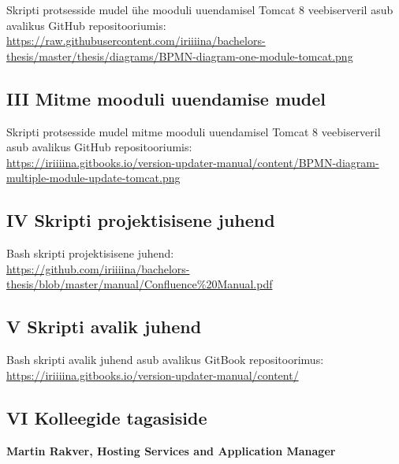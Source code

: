 \documentclass[12pt]{article}
\begin{document}
  Skripti protsesside mudel ühe mooduli uuendamisel Tomcat 8 veebiserveril asub avalikus GitHub repositooriumis:\\
  \url{https://raw.githubusercontent.com/iriiiina/bachelors-thesis/master/thesis/diagrams/BPMN-diagram-one-module-tomcat.png}
  
  \subsection*{III Mitme mooduli uuendamise mudel}
  \label{bpmn-many}
  
  Skripti protsesside mudel mitme mooduli uuendamisel Tomcat 8 veebiserveril asub avalikus GitHub repositooriumis:\\
  \url{https://iriiiina.gitbooks.io/version-updater-manual/content/BPMN-diagram-multiple-module-update-tomcat.png}
  
  \subsection*{IV Skripti projektisisene juhend}
  \label{documentation}
  
  Bash skripti projektisisene juhend:\\
  \url{https://github.com/iriiiina/bachelors-thesis/blob/master/manual/Confluence%20Manual.pdf}
  
  \subsection*{V Skripti avalik juhend}
  \label{public-documentation}
  
  Bash skripti avalik juhend asub avalikus GitBook repositoorimus:\\
  \url{https://iriiiina.gitbooks.io/version-updater-manual/content/}
  
  \subsection*{VI Kolleegide tagasiside}
  \label{feedback}
  
  \textbf{Martin Rakver, Hosting Services and Application Manager}
  
\end{document}
